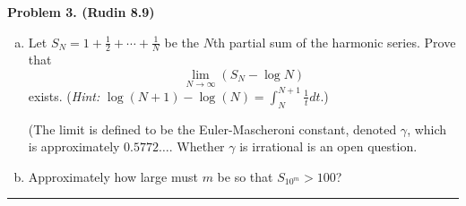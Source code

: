 \documentclass[leqno]{article}
\theoremstyle{nonumberplain}
\begin{document}
\pagebreak




\noindent\textbf{Problem 3. (Rudin 8.9)} 
\begin{enumerate}[(a)]
\item Let $S_N = 1+\frac{1}{2}+\cdots + \frac{1}{N}$ be the $N$th partial sum of the harmonic series. Prove that
\[
\lim_{N\to \infty} (S_N-\log N)
\]
exists. (\emph{Hint:} $\log (N+1)-\log(N)=\int_N^{N+1} \frac{1}{t} dt$.) 

(The limit is defined to be the Euler-Mascheroni constant, denoted $\gamma$, which is approximately $0.5772\dots$. Whether $\gamma$ is irrational is an open question.

\item Approximately how large must $m$ be so that $S_{10^m}>100$?

\end{enumerate}

\noindent\rule[0.5ex]{\linewidth}{1pt}
\end{document}
